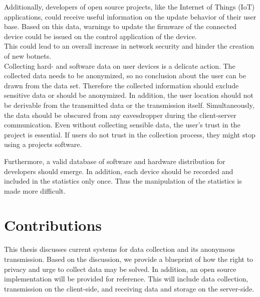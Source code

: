 Additionally, developers of open source projects, like the Internet of Things (IoT) applications, could receive useful
information on the update behavior of their user base. Based on this data, warnings to update the firmware of the
connected device could be issued on the control application of the device.\\
This could lead to an overall increase in network security and hinder the creation of new botnets.\\

Collecting hard- and software data on user devices is a delicate action. The collected data needs to be anonymized,
so no conclusion about the user can be drawn from the data set. Therefore the collected information should exclude
sensitive data or should be anonymized. 
In addition, the user location should not be derivable from the transmitted data or the transmission itself. Simultaneously, the data should be obscured from any eavesdropper during the client-server communication. Even without collecting sensible data, the user's trust in the project is essential. If users do not trust in the collection process, they might stop using a projects software.

Furthermore, a valid database of software and hardware distribution for developers should emerge. In addition,
each device should be recorded and included in the statistics only once.
Thus the manipulation of the statistics is made more difficult.



\section{Contributions}
\label{sec:intro:contrib}
%

This thesis discusses current systems for data collection and its anonymous transmission. Based on the discussion, we provide a blueprint of how the right to privacy and urge to collect data may be solved.
In addition, an open source implementation will be provided for reference.
This will include data collection, transmission on the client-side, and receiving data and storage on the server-side.

